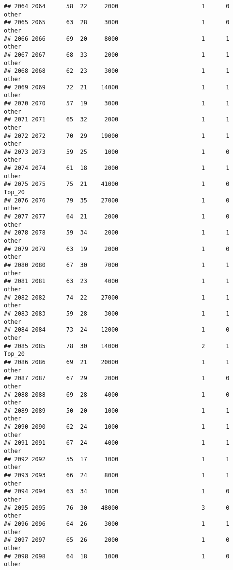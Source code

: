 \documentclass[
]{article}
\begin{document}
\begin{verbatim}
## 2064 2064      58  22     2000                        1      0    other
## 2065 2065      63  28     3000                        1      0    other
## 2066 2066      69  20     8000                        1      1    other
## 2067 2067      68  33     2000                        1      1    other
## 2068 2068      62  23     3000                        1      1    other
## 2069 2069      72  21    14000                        1      1    other
## 2070 2070      57  19     3000                        1      1    other
## 2071 2071      65  32     2000                        1      1    other
## 2072 2072      70  29    19000                        1      1    other
## 2073 2073      59  25     1000                        1      0    other
## 2074 2074      61  18     2000                        1      1    other
## 2075 2075      75  21    41000                        1      0   Top_20
## 2076 2076      79  35    27000                        1      0    other
## 2077 2077      64  21     2000                        1      0    other
## 2078 2078      59  34     2000                        1      1    other
## 2079 2079      63  19     2000                        1      0    other
## 2080 2080      67  30     7000                        1      1    other
## 2081 2081      63  23     4000                        1      1    other
## 2082 2082      74  22    27000                        1      1    other
## 2083 2083      59  28     3000                        1      1    other
## 2084 2084      73  24    12000                        1      0    other
## 2085 2085      78  30    14000                        2      1   Top_20
## 2086 2086      69  21    20000                        1      1    other
## 2087 2087      67  29     2000                        1      0    other
## 2088 2088      69  28     4000                        1      0    other
## 2089 2089      50  20     1000                        1      1    other
## 2090 2090      62  24     1000                        1      1    other
## 2091 2091      67  24     4000                        1      1    other
## 2092 2092      55  17     1000                        1      1    other
## 2093 2093      66  24     8000                        1      1    other
## 2094 2094      63  34     1000                        1      0    other
## 2095 2095      76  30    48000                        3      0    other
## 2096 2096      64  26     3000                        1      1    other
## 2097 2097      65  26     2000                        1      0    other
## 2098 2098      64  18     1000                        1      0    other

\end{verbatim}
\end{document}
